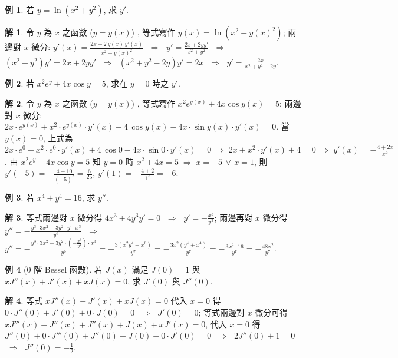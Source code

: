 \documentclass[12pt]{extarticle}
\newcommand{\ds}{\displaystyle}
\newcommand{\ie}{\;\Longrightarrow\;}
\theoremstyle{definition}
\newtheorem*{ex}{例}
\newtheorem*{sol}{解}
\begin{document}
\begin{ex}
  若 $\ds y = \ln(x^2 + y^2)$, 求 $y'$.     
\end{ex}

\begin{sol}
  令 $y$ 為 $x$ 之函數 ($y = y(x)$) , 等式寫作 $\ds y(x) = \ln\left(x^2 + y(x)^2\right)$; 兩邊對 $x$ 微分: $\ds y'(x) = \frac{2 x + 2\,y(x)\,y'(x)}{x^2 + y(x)^2}$ $\ie$ $\ds y' = \frac{2 x + 2 y y'}{x^2 + y^2}$ $\ie$ $\ds (x^2 + y^2) y' = 2x + 2y y'$ $\ie$ $\ds(x^2 + y^2 - 2y)y' = 2x$ $\ie$ $\ds y' = \frac{2x}{x^2 + y^2 - 2y}$.
\end{sol}

\begin{ex}
  若 $\ds x^2 e^y + 4x\cos y = 5$, 求在 $y = 0$ 時之 $\ds y'$.     
\end{ex}

\begin{sol}
  令 $y$ 為 $x$ 之函數 ($y = y(x)$) , 等式寫作 $\ds x^2 e^{y(x)} + 4x\cos{y(x)} = 5$; 兩邊對 $x$ 微分: $\ds 2x\cdot e^{y(x)} + x^2\cdot e^{y(x)}\cdot y'(x) + 4\,\cos{y(x)} - 4x\cdot\sin{y(x)}\cdot y'(x) = 0$. 當 $y(x) = 0$, 上式為 $\ds 2x\cdot e^{0} + x^2\cdot e^{0}\cdot y'(x) + 4\,\cos{0} - 4x\cdot\sin{0}\cdot y'(x) = 0 \ie 2x + x^2\cdot y'(x) + 4 = 0 \ie y'(x) = -\frac{4 + 2x}{x^2}$. 由 $\ds x^2 e^y + 4x\cos y = 5$ 知 $y = 0$ 時 $\ds x^2 + 4x = 5\ie x = -5\,\vee\,x = 1$, 則 $\ds y'(-5) = -\frac{4 - 10}{(-5)^2} = \frac{6}{25}$, $\ds y'(1) = -\frac{4 + 2}{1^2} = -6$. 
\end{sol}

\begin{ex}
  若 $\ds x^4 + y^4 = 16$, 求 $y''$.     
\end{ex}

\begin{sol}
  等式兩邊對 $x$ 微分得 $\ds 4x^3 + 4 y^3 y' = 0$ $\ie$ $\ds y' = -\frac{x^3}{y^3}$; 兩邊再對 $x$ 微分得 $\ds y'' = -\frac{y^3\cdot 3x^2 - 3y^2\cdot y'\cdot x^3}{y^6}$ $\ie$ $\ds y'' = -\frac{y^3\cdot 3x^2 - 3y^2\cdot(-\frac{x^3}{y^3})\cdot x^3}{y^6} = -\frac{3(x^2y^4 + x^6)}{y^7} = -\frac{3x^2(y^4 + x^4)}{y^7} = -\frac{3x^2\cdot 16}{y^7} = -\frac{48x^2}{y^7}$.
\end{sol}

\begin{ex}[$0$ 階 Bessel 函數]
  若 $J(x)$ 滿足 $J(0) = 1$ 與 $\ds xJ''(x) + J'(x) + xJ(x) = 0$, 求 $J'(0)$ 與 $J''(0)$.     
\end{ex}

\begin{sol}
  等式 $\ds xJ''(x) + J'(x) + xJ(x) = 0$ 代入 $x = 0$ 得 $0\cdot J''(0) + J'(0) + 0\cdot J(0) = 0$ $\ie$ $J'(0) = 0$; 等式兩邊對 $x$ 微分可得 $\ds xJ'''(x) + J''(x) + J''(x) + J(x) + xJ'(x) = 0$, 代入 $x = 0$ 得 $J''(0) + 0\cdot J'''(0) + J''(0) + J(0) + 0\cdot J'(0) = 0$ $\ie$ $2 J''(0) + 1 = 0$ $\ie$ $J''(0) = -\frac{1}{2}$. 
\end{sol}
\end{document}
